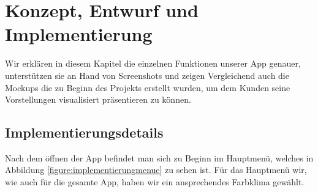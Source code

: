 \chapter{Konzept, Entwurf und Implementierung}
\label{cha:implementierung}

Wir erklären in diesem Kapitel die einzelnen Funktionen unserer App genauer, unterstützen sie an Hand von Screenshots und zeigen Vergleichend auch die Mockups die zu Beginn des Projekts erstellt wurden, um dem Kunden seine Vorstellungen visualisiert präsentieren zu können.

\section{Implementierungsdetails}
\label{sec:implementierung:implementierungsdetails}

Nach dem öffnen der App befindet man sich zu Beginn im Hauptmenü, welches in Abbildung \ref{figure:implementierungmenue} zu sehen ist. Für das Hauptmenü wir, wie auch für die gesamte App, haben wir ein ansprechendes Farbklima gewählt.\\

